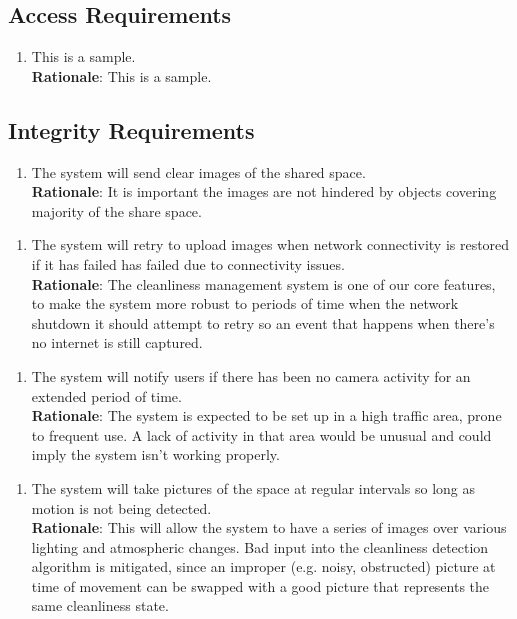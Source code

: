 \documentclass{article}
\begin{document}
\subsection{Access Requirements}
\begin{enumerate}[{AR}1. ]
    \item This is a sample.\\
    \textbf{Rationale}: This is a sample. 
\end{enumerate} 

\subsection{Integrity Requirements}
\begin{enumerate}[{IR}1. ]
    \item The system will send clear images of the shared space.\\
    \textbf{Rationale}: It is important the images are not hindered by objects covering majority of the share space. 
\end{enumerate} 
\begin{enumerate}[{IR}Mag2. ]
    \item The system will retry to upload images when network connectivity is restored if it has failed has failed due to connectivity issues.\\
    \textbf{Rationale}: The cleanliness management system is one of our core features, to make the system more robust to periods of time when the network shutdown it should attempt to retry so an event that happens when there's no internet is still captured. 
\end{enumerate} 
\begin{enumerate}[{IR}Mag3. ]
    \item The system will notify users if there has been no camera activity for an extended period of time.\\
    \textbf{Rationale}: The system is expected to be set up in a high traffic area, prone to frequent use. A lack of activity in that area would be unusual and could imply the system isn't working properly.
\end{enumerate}
\begin{enumerate}[{IR}Jan1. ]
    \item The system will take pictures of the space at regular intervals so long as motion is not being detected.\\
    \textbf{Rationale}: This will allow the system to have a series of images over various lighting and atmospheric changes. Bad input into the cleanliness detection algorithm is mitigated, since an improper (e.g. noisy, obstructed) picture at time of movement can be swapped with a good picture that represents the same cleanliness state.
\end{enumerate} 
\end{document}
